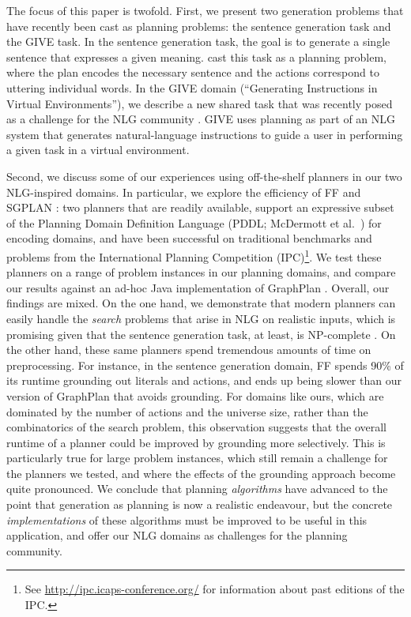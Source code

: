 \documentclass[letterpaper]{article}
\begin{document}
The focus of this paper is twofold. First, we present two generation
problems that have recently been cast as planning problems: the
sentence generation task and the GIVE task. In the sentence generation
task, the goal is to generate a single sentence that expresses a given
meaning. \citet{KolSto07} cast this task as a planning problem, where
the plan encodes the necessary sentence and the actions correspond to
uttering individual words.  In the GIVE domain (``Generating
Instructions in Virtual Environments''), we describe a new shared task
that was recently posed as a challenge for the NLG community
\citep{ByrKolStrCasDalMooObe09}.  GIVE uses planning as part of an NLG
system that generates natural-language instructions to guide a user in
performing a given task in a virtual environment.

Second, we discuss some of our experiences using off-the-shelf
planners in our two NLG-inspired domains. In particular, we explore
the efficiency of FF \citep{HoffmannNebel01} and SGPLAN
\citep{hsu06:_new_featur_in_sgplan_for}: two planners that are readily
available, support an expressive subset of the Planning Domain
Definition Language (PDDL; McDermott et al.~\citeyear{PDDL}) for
encoding domains, and have been successful on traditional benchmarks
and problems from the International Planning Competition
(IPC)\footnote{See \url{http://ipc.icaps-conference.org/} for
  information about past editions of the IPC.}.  We test these
planners on a range of problem instances in our planning domains, and
compare our results against an ad-hoc Java implementation of GraphPlan
\citep{Blum1997}. Overall, our findings are mixed. On the one hand, we
demonstrate that modern planners can easily handle the \emph{search}
problems that arise in NLG on realistic inputs, which is promising
given that the sentence generation task, at least, is NP-complete
\citep{KolStr02}. On the other hand, these same planners spend
tremendous amounts of time on preprocessing. For instance, in the
sentence generation domain, FF spends 90\% of its runtime grounding
out literals and actions, and ends up being slower than our version of
GraphPlan that avoids grounding. For domains like ours, which are
dominated by the number of actions and the universe size, rather than
the combinatorics of the search problem, this observation suggests
that the overall runtime of a planner could be improved by grounding
more selectively. This is particularly true for large problem
instances, which still remain a challenge for the planners we tested,
and where the effects of the grounding approach become quite
pronounced. We conclude that planning \emph{algorithms} have advanced
to the point that generation as planning is now a realistic endeavour,
but the concrete \emph{implementations} of these algorithms must be
improved to be useful in this application, and offer our NLG domains
as challenges for the planning community.
\end{document}
